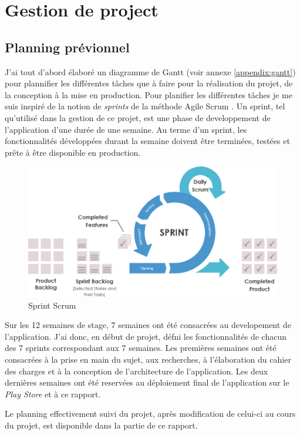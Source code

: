 \section{Gestion de project}

\subsection{Planning prévionnel}

J'ai tout d'abord élaboré un diagramme de Gantt (voir annexe \ref{appendix:gantt}) pour plannifier les différentes tâches que à faire pour la réalisation du projet, de la conception à la mise en production. Pour planifier les différentes tâches je me suis inspiré de la notion de \textit{sprints} de la méthode Agile Scrum \cite{scrum}. Un sprint, tel qu'utilisé dans la gestion de ce projet, est une phase de developpement de l'application d'une durée de une semaine. Au terme d'un sprint, les fonctionnalités développées durant la semaine doivent être terminées, testées et prête à être disponible en production.

\begin{figure}
  \includegraphics[width=.7\linewidth]{content/imgs/scrum_sprint.png}
  \caption{Sprint Scrum}
\end{figure}

Sur les 12 semaines de stage, 7 semaines ont été consacrées au developement de l'application. J'ai donc, en début de projet, défni les fonctionnalités de  chacun des 7 sprints correspondant aux 7 semaines. Les premières semaines ont été consacrées à la prise en main du sujet, aux recherches, à l'élaboration du cahier des charges et à la conception de l'architecture de l'application. Les deux dernières semaines ont été reservées au déploiement final de l'application sur le \textit{Play Store} et à ce rapport.

Le planning effectivement suivi du projet, après modification de celui-ci au cours du projet, est disponible dans la partie  de ce rapport.

